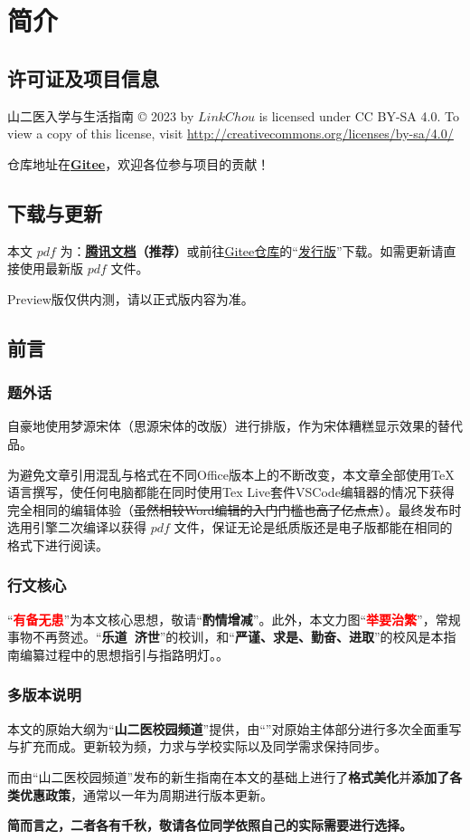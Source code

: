 \chapter[简介]{简介}

\section[许可证及项目信息]{许可证及项目信息}
山二医入学与生活指南 © 2023 by $LinkChou$ is licensed under CC BY-SA 4.0. To view a copy of this license, visit \uline{\href{http://creativecommons.org/licenses/by-sa/4.0/}{http://creativecommons.org/licenses/by-sa/4.0/}}

仓库地址在\textbf{\uline{\href{https://gitee.com/mikazo/guide_for_freshman}{Gitee}}}，欢迎各位参与项目的贡献！

\section[\textcolor{red}{下载与更新}]{下载与更新}
本文 $pdf$ \textbf{}为：\textbf{\uline{\textcolor{red}{\href{https://docs.qq.com/s/ETcQ-ZFSrSsh6MK9bm773q}{腾讯文档}}}（推荐）}或前往\uline{\href{https://gitee.com/mikazo/guide_for_freshman}{Gitee仓库}}的“\uline{\href{https://gitee.com/mikazo/latex_version/releases/latest}{发行版}}”下载。如需更新请直接使用最新版 $pdf$ 文件。

Preview版仅供内测，请以正式版内容为准。

\section[前言]{前言}
\subsection[题外话]{题外话}
自豪地使用梦源宋体（思源宋体的改版）进行排版，作为宋体糟糕显示效果的替代品。

为避免文章引用混乱与格式在不同Office版本上的不断改变，本文章全部使用\TeX 语言撰写，使任何电脑都能在同时使用Tex Live套件VSCode编辑器\footnotemark 的情况下获得完全相同的编辑体验（\sout{虽然相较Word编辑的入门门槛也高了亿点点}）。最终发布时选用\XeLaTeX 引擎二次编译以获得 $pdf$ 文件，保证无论是纸质版还是电子版都能在相同的格式下进行阅读。

\subsection[行文核心]{行文核心}
“\textcolor{red}{\textbf{有备无患}}”为本文核心思想，敬请“\textbf{酌情增减}”。此外，本文力图“\textcolor{red}{\textbf{举要治繁}}”，常规事物不再赘述。“\textbf{乐道\ 济世}”的校训，和“\textbf{严谨、求是、勤奋、进取}”的校风是本指南编纂过程中的思想指引与指路明灯。\textbf{\uuline{\textcolor{red}{浮烟山校区是本文叙述的重点，如无特别说明均指浮烟山校区}}}。

\subsection[多版本说明]{多版本说明}
本文的原始大纲为“\textbf{山二医校园频道}”提供，由“\textbf{}”对原始主体部分进行多次全面重写与扩充而成。更新较为频，力求与学校实际以及同学需求保持同步。

而由“山二医校园频道”发布的新生指南在本文的基础上进行了\textbf{格式美化}并\textbf{添加了各类优惠政策}，通常以一年为周期进行版本更新。

\textbf{简而言之，二者各有千秋，敬请各位同学依照自己的实际需要进行选择。}

